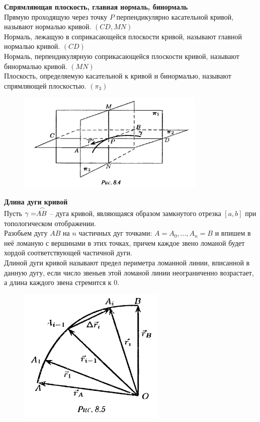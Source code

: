 \documentclass{report}
\begin{document}
\noindent
\textbf{Спрямляющая плоскость, главная нормаль, бинормаль}\\
Прямую проходящую через точку $P$ перпендикулярно касательной кривой,
называют нормалью кривой. $(CD, MN)$\\ 
Нормаль, лежащую в соприкасающейся плоскости кривой,
называют главной нормалью кривой. $(CD)$\\
Нормаль, перпендикулярную соприкасающейся плоскости кривой,
называют бинормалью кривой. $(MN)$\\
Плоскость, определяемую касательной к кривой и бинормалью, 
называют спрямляющей плоскостью. $(\pi_3)$\\
\begin{figure}[ht!]
\centering
\includegraphics[width=90mm]{curve3.png}
\end{figure}


\noindent
\textbf{Длина дуги кривой}\\
Пусть $\gamma = \buildrel\, \, \frown\over{AB}$ -- дуга кривой, являющаяся образом замкнутого отрезка
$[a, b]$ при топологическом отображении.\\
Разобьем дугу $AB$ на $n$ частичных дуг точками: $A = A_0, \ldots, A_n = B$ и впишем в неё ломаную
с вершинами в этих точках, причем каждое звено ломаной будет хордой соответствующей частичной дуги.\\
Длиной дуги кривой называют предел периметра ломанной линии, вписанной в данную дугу, если число
звеньев этой ломаной линии неограниченно возрастает, а длина каждого звена стремится к 0.\\
\begin{figure}[ht!]
\centering
\includegraphics[width=70mm]{curve4.png}
\end{figure}
\end{document}

